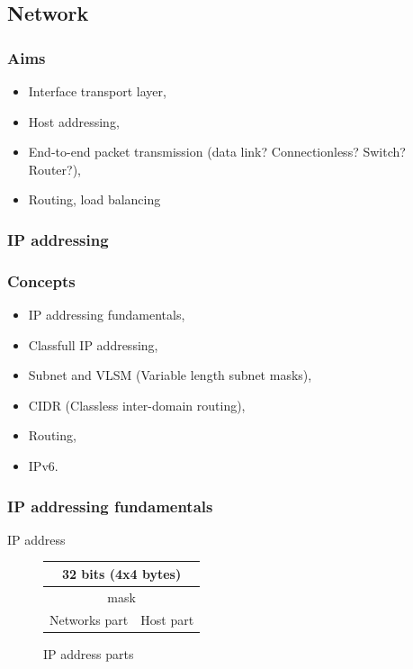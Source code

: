   \subsection{Network}
  \begin{frame}
    \frametitle{Aims}
      \begin{itemize}
        \item Interface transport layer,\pause
	\item Host addressing,\pause
        \item End-to-end packet transmission (data link? Connectionless? Switch? Router?),\pause
        \item Routing, load balancing
      \end{itemize}
  \end{frame}
  \subsubsection{IP addressing}
  \begin{frame}
    \frametitle{Concepts}
      \begin{itemize}
        \item IP addressing fundamentals,
        \item Classfull IP addressing,
        \item Subnet and VLSM (Variable length subnet masks),
        \item CIDR (Classless inter-domain routing),
        \item Routing,
        \item IPv6.
      \end{itemize}
  \end{frame}

  \begin{frame}
    \frametitle{IP addressing fundamentals}
    \begin{block}{IP address}
      \begin{figure}
        \centering
        \begin{tabular}{|c|c|}
          \multicolumn{2}{c}{32 bits (4x4 bytes)} \\ \hline
           \multicolumn{2}{|c|}{\color{brown}mask} \\ \hline
          \color{ForestGreen}Networks part & \color{blue}Host part \\ \hline
        \end{tabular}
        \caption{IP address parts}
        \label{fig:inside_ip_address}
      \end{figure}
    \end{block}
  \end{frame}

